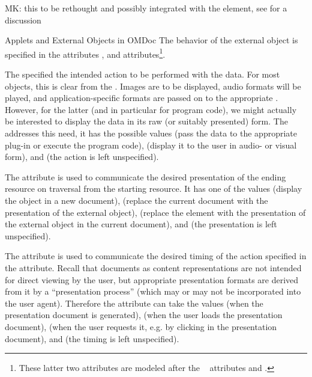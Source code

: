 \begin{module}[id=ext]
\begin{omgroup}[id=ext,short=Auxiliary Elements]
\begin{oldpart}{MK: this to be rethought and possibly integrated with the
     element, see  for a discussion}
\begin{omgroup}[id=applets]{Applets and External Objects in OMDoc}
The behavior of the external object is specified in the attributes
,  and 
attributes\footnote{These latter two attributes are modeled after the
  {\xlink}~\cite{DeRMal:xlink01} attributes {} and
  {}.}.
  
The  specified the intended action to be performed with the
data. For most objects, this is clear from the {}. Images are to be
displayed, audio formats will be played, and application-specific formats are passed on to
the appropriate {}. However, for the latter (and in particular for
program code), we might actually be interested to display the data in its raw (or suitably
presented) form. The  addresses this need, it has the possible
values  (pass the data to the appropriate plug-in or
execute the program code),  (display it to the user in
audio- or visual form), and  (the action is left
unspecified).
  
The  attribute is used to communicate the desired presentation of
the ending resource on traversal from the starting resource. It has one of the values
 (display the object in a new document),
 (replace the current document with the presentation of the
external object),  (replace the  element
with the presentation of the external object in the current document), and
 (the presentation is left unspecified).
  
The  attribute is used to communicate the desired timing of
the action specified in the  attribute.  Recall that \omdoc
documents as content representations are not intended for direct viewing by the user, but
appropriate presentation formats are derived from it by a ``presentation process'' (which
may or may not be incorporated into the user agent). Therefore the
 attribute can take the values
 (when the presentation document is generated),
 (when the user loads the presentation document),
 (when the user requests it, e.g. by clicking in the
presentation document), and  (the timing is left
unspecified).
  

\end{omgroup}
\end{oldpart}
\end{omgroup}
\end{module}

